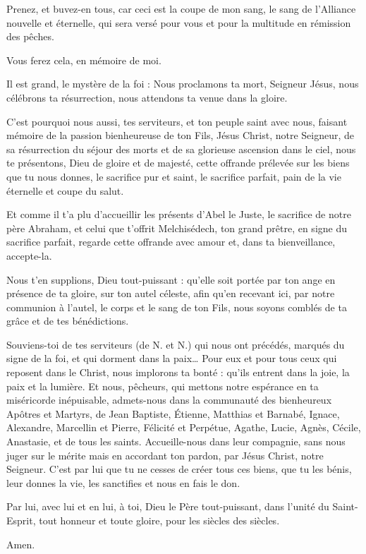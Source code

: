 Prenez, et buvez-en tous, car ceci est la coupe de mon sang, le sang de l'Alliance nouvelle et éternelle, qui sera versé pour vous et pour la multitude en rémission des pêches.

Vous ferez cela, en mémoire de moi.

Il est grand, le mystère de la foi :
Nous proclamons ta mort, Seigneur Jésus, nous célébrons ta résurrection, nous attendons ta venue dans la gloire.

C'est pourquoi nous aussi, tes serviteurs, et ton peuple saint avec nous, faisant mémoire de la passion bienheureuse de ton Fils, Jésus Christ, notre Seigneur, de sa résurrection du séjour des morts et de sa glorieuse ascension dans le ciel, nous te présentons, Dieu de gloire et de majesté, cette offrande prélevée sur les biens que tu nous donnes, le sacrifice pur et saint, le sacrifice parfait, pain de la vie éternelle et coupe du salut.

Et comme il t'a plu d'accueillir les présents d'Abel le Juste, le sacrifice de notre père Abraham, et celui que t'offrit Melchisédech, ton grand prêtre, en signe du sacrifice parfait, regarde cette offrande avec amour et, dans ta bienveillance, accepte-la.

Nous t'en supplions, Dieu tout-puissant : qu'elle soit portée par ton ange en présence de ta gloire, sur ton autel céleste, afin qu'en recevant ici, par notre communion à l'autel, le corps et le sang de ton Fils, nous soyons comblés de ta grâce et de tes bénédictions.

Souviens-toi de tes serviteurs (de N. et N.) qui nous ont précédés, marqués du signe de la foi, et qui dorment dans la paix… Pour eux et pour tous ceux qui reposent dans le Christ, nous implorons ta bonté : qu'ils entrent dans la joie, la paix et la lumière. Et nous, pêcheurs, qui mettons notre espérance en ta miséricorde inépuisable, admets-nous dans la communauté des bienheureux Apôtres et Martyrs, de Jean Baptiste, Étienne, Matthias et Barnabé, Ignace, Alexandre, Marcellin et Pierre, Félicité et Perpétue, Agathe, Lucie, Agnès, Cécile, Anastasie, et de tous les saints. Accueille-nous dans leur compagnie, sans nous juger sur le mérite mais en accordant ton pardon, par Jésus Christ, notre Seigneur. C'est par lui que tu ne cesses de créer tous ces biens, que tu les bénis, leur donnes la vie, les sanctifies et nous en fais le don.

Par lui, avec lui et en lui, à toi, Dieu le Père tout-puissant, dans l'unité du Saint-Esprit, tout honneur et toute gloire, pour les siècles des siècles.

Amen.
